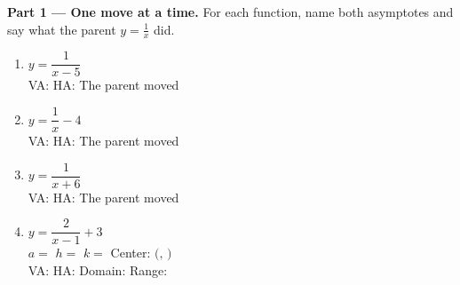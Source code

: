 \documentclass[10pt]{article}
\begin{document}
\begin{tcolorbox}[colback=white, colframe=black!40, title=\textbf{Tier R --- Remediate},
    fonttitle=\bfseries, arc=1.5mm, left=3mm, right=3mm, top=2mm, bottom=2mm, breakable]
\textbf{Part 1 --- One move at a time.} For each function, name both asymptotes and say what the parent
$y=\frac1x$ did.
\begin{enumerate}[leftmargin=1.9em, itemsep=8pt]
  \item $y=\dfrac{1}{x-5}$ \\[3pt]
        VA:  \quad HA:  \quad The parent moved 
  \item $y=\dfrac{1}{x}-4$ \\[3pt]
        VA:  \quad HA:  \quad The parent moved 
  \item $y=\dfrac{1}{x+6}$ \\[3pt]
        VA:  \quad HA:  \quad The parent moved 
  \item $y=\dfrac{2}{x-1}+3$ \\[3pt]
        $a=$  \quad $h=$  \quad $k=$  \quad
        Center: $($$,\,$$)$ \\[3pt]
        VA:  \quad HA:  \quad Domain:  \quad
        Range: 
\end{enumerate}


\end{tcolorbox}
\end{document}
